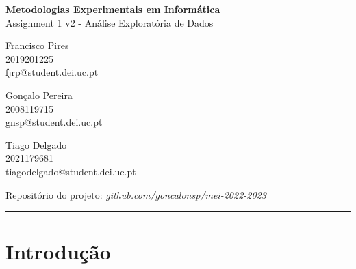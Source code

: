 \documentclass{uofa-eng-assignment}
\newcommand*{\course}{Metodologias Experimentais em Informática}
\newcommand*{\assignment}{Assignment 1 v2 - Análise Exploratória de Dados}
\begin{document}

\begin{center}
    \textbf{\large \course}\\
    \assignment
\end{center}

\begin{center}
\begin{minipage}{0.3\textwidth}
\begin{center}Francisco Pires\\2019201225\\fjrp@student.dei.uc.pt\end{center}
\end{minipage}
\begin{minipage}{0.3\textwidth}
\begin{center}Gonçalo Pereira\\2008119715\\gnsp@student.dei.uc.pt\end{center}
\end{minipage}
\begin{minipage}{0.3\textwidth}
\begin{center}Tiago Delgado\\2021179681\\tiagodelgado@student.dei.uc.pt\end{center}
\end{minipage}
\end{center}

{\centering Repositório do projeto: \emph{github.com/goncalonsp/mei-2022-2023}\par }

\rule{0.9\linewidth}{0.1mm}

\section{Introdução }
\end{document}
